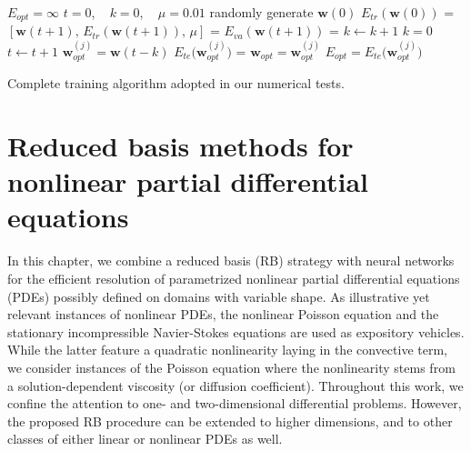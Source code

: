 \documentclass[12pt, a4paper, twoside, openright, notitlepage]{report}
\numberwithin{equation}{chapter}
\theoremstyle{theorem}
\theoremstyle{definition}
\theoremstyle{remark}
\theoremstyle{proposition}
\numberwithin{figure}{chapter}
\begin{document}
		\begin{algorithm}[H]	
			\begin{algorithmic}[1]
					\State $E_{opt} = \infty$
						\State $t = 0$, ~ $k = 0$, ~ $\mu = 0.01$
						\State randomly generate $\mathbf{w}(0)$
						\State $E_{tr}(\mathbf{w}(0))$ = 
							\State $\left[ \mathbf{w}(t+1), \, E_{tr}(\mathbf{w}(t+1)), \, \mu \right]$ = 
							\State $E_{va}(\mathbf{w}(t+1))$ = 
								\State $k \leftarrow k + 1$
							\Else
								\State $k = 0$
							\EndIf
							\State $t \leftarrow t+1$					
						\EndWhile		
						\State $\mathbf{w}_{opt}^{(j)} = \mathbf{w}(t-k)$
						\State $E_{te} \big( \mathbf{w}_{opt}^{(j)} \big)$ = 
							\State $\mathbf{w}_{opt} = \mathbf{w}_{opt}^{(j)}$
							\State $E_{opt} = E_{te} \big( \mathbf{w}_{opt}^{(j)} \big)$
						\EndIf
					\EndFor
				\EndFunction
				
			\end{algorithmic}
			
			\caption{Complete training algorithm adopted in our numerical tests.}
			\label{alg:offline-learning-complete}
		\end{algorithm}
		
		

	\chapter{Reduced basis methods for nonlinear partial differential equations}
	\label{chapter:Reduced basis methods for nonlinear partial differential equations}
			
		In this chapter, we combine a reduced basis (RB) strategy with neural networks for the efficient resolution of parametrized nonlinear partial differential equations (PDEs) possibly defined on domains with variable shape. As illustrative yet relevant instances of nonlinear PDEs, the nonlinear Poisson equation and the stationary incompressible Navier-Stokes equations are used as expository vehicles. While the latter feature a quadratic nonlinearity laying in the convective term, we consider instances of the Poisson equation where the nonlinearity stems from a solution-dependent viscosity (or diffusion coefficient). Throughout this work, we confine the attention to one- and two-dimensional differential problems. However, the proposed RB procedure can be extended to higher dimensions, and to other classes of either linear or nonlinear PDEs as well.
		
\end{document}
